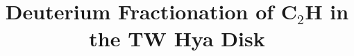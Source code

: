 \documentclass[linenumbers, twocolumn, times]{aastex631}
\begin{document}
\title{Deuterium Fractionation of C$_2$H in the TW Hya Disk}


\end{document}
